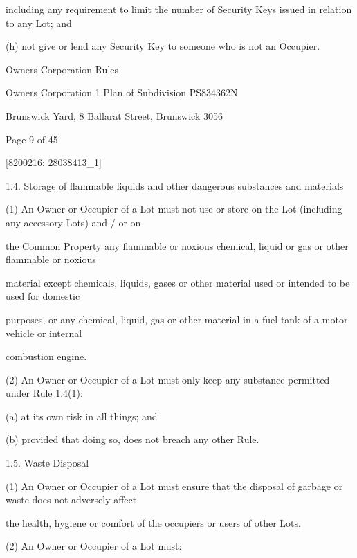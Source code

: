 \documentclass{article}
\begin{document}
{\fontsize{10.02}{1}including any requirement to limit the number of Security Keys issued in relation to any Lot; and }

{\fontsize{9.962}{1}(h) not give or lend any Security Key to someone who is not an Occupier. }

\newpage





{\fontsize{9}{1}Owners Corporation Rules }

{\fontsize{9}{1}Owners Corporation 1 Plan of Subdivision PS834362N }

{\fontsize{9}{1}Brunswick Yard, 8 Ballarat Street, Brunswick 3056 }


{\fontsize{9}{1}Page 9  of 45 }



{\fontsize{7.02}{1}[8200216: 28038413\_1] }


{\fontsize{9.99}{1}1.4. Storage of flammable liquids and other dangerous substances and materials }

{\fontsize{9.962}{1}(1) An Owner or Occupier of a Lot must not use or store on the Lot (including any accessory Lots) and / or on }

{\fontsize{10.02}{1}the Common Property any flammable or noxious chemical, liquid or gas or other flammable or noxious }

{\fontsize{10.02}{1}material except chemicals, liquids, gases or other material used or intended to be used for domestic }

{\fontsize{10.02}{1}purposes, or any chemical, liquid, gas or other material in a fuel tank of a motor vehicle or internal }

{\fontsize{10.02}{1}combustion engine. }

{\fontsize{9.962}{1}(2) An Owner or Occupier of a Lot must only keep any substance permitted under Rule 1.4(1): }

{\fontsize{9.962}{1}(a) at its own risk in all things; and }

{\fontsize{9.962}{1}(b) provided that doing so, does not breach any other Rule. }

{\fontsize{9.99}{1}1.5. Waste Disposal }

{\fontsize{9.962}{1}(1) An Owner or Occupier of a Lot must ensure that the disposal of garbage or waste does not adversely affect }

{\fontsize{10.02}{1}the health, hygiene or comfort of the occupiers or users of other Lots. }

{\fontsize{9.962}{1}(2) An Owner or Occupier of a Lot must: }
\end{document}
